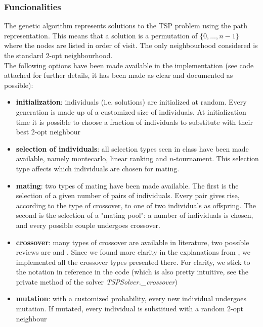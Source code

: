 \documentclass{article}
\begin{document}
\subsubsection{Funcionalities}
The genetic algorithm represents solutions to the TSP problem using the path representation. This means that a solution is a permutation of $\{0, \ldots, n-1\}$ where the nodes are listed in order of visit. The only neighbourhood considered is the standard 2-opt neighbourhood. \\
The following options have been made available in the implementation (see code attached for further details, it has been made as clear and documented as possible):
\begin{itemize}
\item \textbf{initialization}: individuals (i.e. solutions) are initialized at random. Every generation is made up of a customized size of individuals. At initialization time it is possible to choose a fraction of individuals to substitute with their best 2-opt neighbour

\item \textbf{selection of individuals}: all selection types seen in class have been made available, namely montecarlo, linear ranking and $n$-tournament. This selection type affects which individuals are chosen for mating.

\item \textbf{mating}: two types of mating have been made available. The first is the selection of a given number of pairs of individuals. Every pair gives rise, according to the type of crossover, to one of two individuals as offspring. The second is the selection of a "mating pool": a number of individuals is chosen, and every possible couple undergoes crossover.

\item \textbf{crossover}: many types of crossover are available in literature, two possible reviews are \cite{gupta2011study} and \cite{abdoun2012comparative}. Since we found more clarity in the explanations from \cite{gupta2011study}, we implemented all the crossover types presented there. For clarity, we stick to the notation in reference in the code (which is also pretty intuitive, see the private method of the solver \textit{TSPSolver.\_crossover})

\item \textbf{mutation}: with a customized probability, every new individual undergoes mutation. If mutated, every individual is substitued with a random 2-opt neighbour


\end{itemize}
\end{document}

